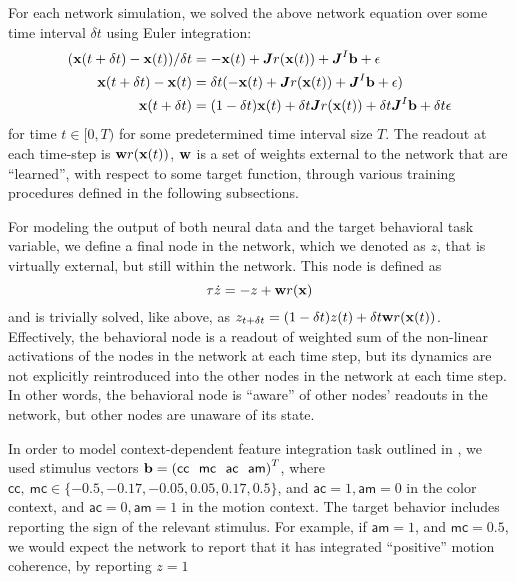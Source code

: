 \documentclass[12pt,a4paper,final]{iopart}
\begin{document}
For each network simulation, we solved the above network equation over some time interval $\delta t$ using Euler integration:
\begin{align*}
    ({\bf x}(t+\delta t) - {\bf x}(t)) / \delta t &= -{\bf x}(t) + \boldsymbol{J}r({\bf x}(t)) + \boldsymbol{J}^I{\bf b} + {\bf \epsilon} \\
    {\bf x}(t+\delta t) - {\bf x}(t) &= \delta t(-{\bf x}(t) + \boldsymbol{J}r({\bf x}(t)) + \boldsymbol{J}^I{\bf b} + {\bf \epsilon}) \\
    {\bf x}(t+\delta t) &= (1 - \delta t){\bf x}(t) + \delta t \boldsymbol{J}r({\bf x}(t)) + \delta t \boldsymbol{J}^I{\bf b} + \delta t {\bf \epsilon}
\end{align*}
for time $t \in [0, T)$ for some predetermined time interval size $T$. The readout at each time-step is ${\bf w}r({\bf x}(t))$, ${\bf w}$ is a set of weights external to the network that are ``learned'', with respect to some target function, through various training procedures defined in the following subsections.

For modeling the output of both neural data and the target behavioral task variable, we define a final node in the network, which we denoted as $z$, that is virtually external, but still within the network. This node is defined as 
\[
    \tau \dot{z} = -z + {\bf w}r({\bf x})
\]
and is trivially solved, like above, as $z_{t + \delta t} = (1-\delta t) z(t) + \delta t {\bf w}r({\bf x}(t))$. Effectively, the behavioral node is a readout of weighted sum of the non-linear activations of the nodes in the network at each time step, but its dynamics are not explicitly reintroduced into the other nodes in the network at each time step. In other words, the behavioral node is ``aware'' of other nodes' readouts in the network, but other nodes are unaware of its state. 

In order to model context-dependent feature integration task outlined in \cite{Mante2013}, we used stimulus vectors ${\bf b} = \left(\mathsf{cc} \ \ \mathsf{mc} \ \ \mathsf{ac} \ \ \mathsf{am}\right)^T$, where $\mathsf{cc}, \ \mathsf{mc} \in \{-0.5, -0.17, -0.05, 0.05, 0.17, 0.5\}$, and $\mathsf{ac} = 1, \mathsf{am} = 0$ in the color context, and $\mathsf{ac} = 0, \mathsf{am} = 1$ in the motion context. The target behavior includes reporting the sign of the relevant stimulus. For example, if $\mathsf{am} = 1$, and $\mathsf{mc} = 0.5$, we would expect the network to report that it has integrated ``positive'' motion coherence, by reporting $z = 1$
\end{document}
